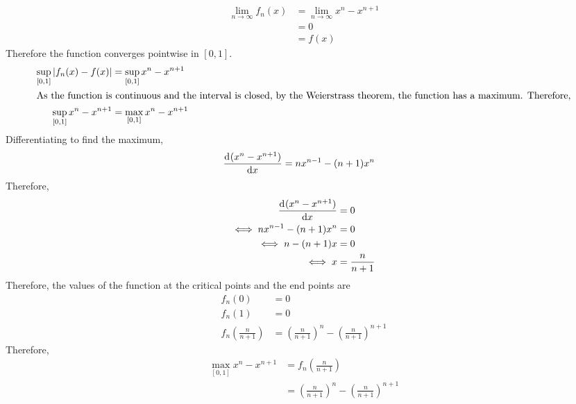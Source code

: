 \documentclass[fleqn, a4paper, 12pt, twoside]{article}
\theoremstyle{definition}
\theoremstyle{theorem}
\begin{document}
\begin{solution}
	\begin{align*}
		\lim\limits_{n \to \infty} f_n(x) & = \lim\limits_{n \to \infty} x^n - x^{n + 1} \\
                                                  & = 0                                          \\
                                                  & = f(x)
	\end{align*}
	Therefore the function converges pointwise in $[0,1]$.
	\begin{align*}
		\sup\limits_{[0,1]} |f_n(x) - f(x)| & = \sup\limits_{[0,1]} x^n - x^{n + 1} \\
		\intertext{As the function is continuous and the interval is closed, by the Weierstrass theorem, the function has a maximum. Therefore,}
		\sup\limits_{[0,1]} x^n - x^{n + 1} & = \max\limits_{[0,1]} x^n - x^{n + 1} \\
	\end{align*}
	Differentiating to find the maximum,
	\begin{align*}
		\dod{(x^n - x^{n + 1})}{x} & = n x^{n - 1} - (n + 1) x^n
	\end{align*}
	Therefore,
	\begin{align*}
		\dod{(x^n - x^{n + 1})}{x}     & = 0 \\
		\iff n x^{n - 1} - (n + 1) x^n & = 0 \\
		\iff n - (n + 1) x             & = 0 \\
		\iff x                         & = \frac{n}{n + 1}
	\end{align*}
	Therefore, the values of the function at the critical points and the end points are
	\begin{align*}
		f_n(0)                             & = 0 \\
		f_n(1)                             & = 0 \\
		f_n \left( \frac{n}{n + 1} \right) & = \left( \frac{n}{n + 1} \right)^n - \left( \frac{n}{n + 1} \right)^{n + 1}
	\end{align*}
	Therefore,
	\begin{align*}
		\max\limits_{[0,1]} x^n - x^{n + 1} & = f_n \left( \frac{n}{n + 1} \right)                                        \\
                                                    & = \left( \frac{n}{n + 1} \right)^n - \left( \frac{n}{n + 1} \right)^{n + 1} \\
	\end{align*}

\end{solution}
\end{document}
